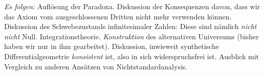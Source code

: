 \documentclass{zirkelblatt}
\theoremstyle{definition}
\theoremstyle{plain}
\theoremstyle{remark}
\begin{document}
\vfill

\emph{Es folgen:} Auflösung der Paradoxa. Diskussion der Konsequenzen davon,
dass wir das Axiom vom ausgeschlossenen Dritten nicht mehr verwenden können.
Diskussion des Schwebezustands infinitesimaler Zahlen: Diese sind nämlich
\emph{nicht nicht} Null. Integrationstheorie. \emph{Konstruktion} des
alternativen Universums (bisher haben wir nur in ihm gearbeitet). Diskussion,
inwieweit synthetische Differentialgeometrie \emph{konsistent} ist, also in
sich widerspruchsfrei ist. Ausblick mit Vergleich zu anderen Ansätzen von
Nichtstandardanalysis.
\end{document}
